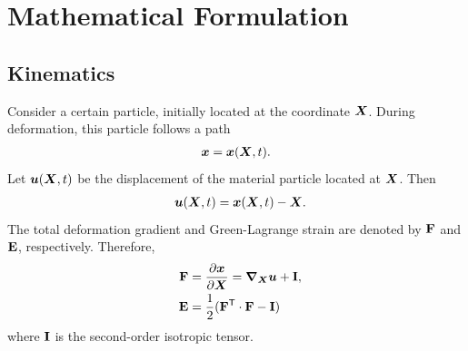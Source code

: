 \chapter{Mathematical Formulation}

\section{Kinematics}
Consider a certain particle, initially located at the coordinate ${\bm{X}}$. During deformation, this particle follows a path 
\begin{gather}
{\bm{x}} = {\bm{x}}({\bm{X}},t).
\end{gather}
Let ${\bm{u}}({\bm{X}}, t)$ be the displacement of the material particle located at ${\bm{X}}$. Then
\begin{gather}
    \u(\X, t) = \x(\X, t) - \X.
\end{gather}
The total deformation gradient and Green-Lagrange strain are denoted by $\mathbf{F}$ and $\mathbf{E}$, respectively. Therefore, 
\begin{align}
    \F &= \pdiff{\x}{\X} = \nablaX \u + \I, \\
    \E &= \fc{1}{2}(\F^\T \cdot \F - \I)
\end{align}
where $\mathbf{I}$ is the second-order isotropic tensor.


